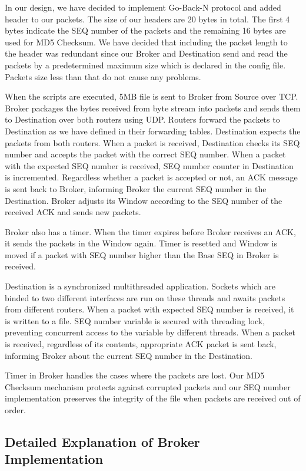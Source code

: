 \documentclass[conference]{IEEEtran}
\begin{document}
In our design, we have decided to implement Go-Back-N protocol and added header to our packets. The size of our headers are 20 bytes in total. The first 4 bytes indicate the SEQ number of the packets and the remaining 16 bytes are used for MD5 Checksum. We have decided that including the packet length to the header was redundant since our Broker and Destination send and read the packets by a predetermined maximum size which is declared in the config file. Packets size less than that do not cause any problems.

When the scripts are executed, 5MB file is sent to Broker from Source over TCP. Broker packages the bytes received from byte stream into packets and sends them to Destination over both routers using UDP. Routers forward the packets to Destination as we have defined in their forwarding tables. Destination expects the packets from both routers. When a packet is received, Destination checks its SEQ number and accepts the packet with the correct SEQ number. When a packet with the expected SEQ number is received, SEQ number counter in Destination is incremented. Regardless whether a packet is accepted or not, an ACK message is sent back to Broker, informing Broker the current SEQ number in the Destination. Broker adjusts its Window according to the SEQ number of the received ACK and sends new packets.

Broker also has a timer. When the timer expires before Broker receives an ACK, it sends the packets in the Window again. Timer is resetted and Window is moved if a packet with SEQ number higher than the Base SEQ in Broker is received.

Destination is a synchronized multithreaded application. Sockets which are binded to two different interfaces are run on these threads and awaits packets from different routers. When a packet with expected SEQ number is received, it is written to a file. SEQ number variable is secured with threading lock, preventing concurrent access to the variable by different threads. When a packet is received, regardless of its contents, appropriate ACK packet is sent back, informing Broker about the current SEQ number in the Destination.

Timer in Broker handles the cases where the packets are lost. Our MD5 Checksum mechanism protects against corrupted packets and our SEQ number implementation preserves the integrity of the file when packets are received out of order.

\subsection{Detailed Explanation of Broker Implementation}
\end{document}
